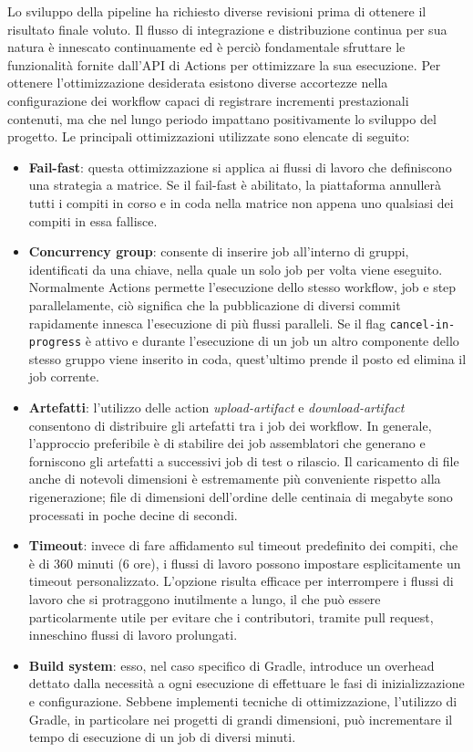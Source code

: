 Lo sviluppo della pipeline ha richiesto diverse revisioni prima di ottenere il risultato finale voluto. Il flusso di integrazione e distribuzione continua per sua natura è innescato continuamente ed è perciò fondamentale sfruttare le funzionalità fornite dall'API di Actions per ottimizzare la sua esecuzione. Per ottenere l'ottimizzazione desiderata esistono diverse accortezze nella configurazione dei workflow capaci di registrare incrementi prestazionali contenuti, ma che nel lungo periodo impattano positivamente lo sviluppo del progetto. Le principali ottimizzazioni utilizzate sono elencate di seguito:
\begin{itemize}
	\item \textbf{Fail-fast}: questa ottimizzazione si applica ai flussi di lavoro che definiscono una strategia a matrice. Se il fail-fast è abilitato, la piattaforma annullerà tutti i compiti in corso e in coda nella matrice non appena uno qualsiasi dei compiti in essa fallisce.
	\item \textbf{Concurrency group}: consente di inserire job all'interno di gruppi, identificati da una chiave, nella quale un solo job per volta viene eseguito. Normalmente Actions permette l'esecuzione dello stesso workflow, job e step parallelamente, ciò significa che la pubblicazione di diversi commit rapidamente innesca l'esecuzione di più flussi paralleli. Se il flag \texttt{cancel-in-progress} è attivo e durante l'esecuzione di un job un altro componente dello stesso gruppo viene inserito in coda, quest'ultimo prende il posto ed elimina il job corrente.
	\item \textbf{Artefatti}: l'utilizzo delle action \textit{upload-artifact} e \textit{download-artifact} consentono di distribuire gli artefatti tra i job dei workflow. In generale, l'approccio preferibile è di stabilire dei job assemblatori che generano e forniscono gli artefatti a successivi job di test o rilascio. Il caricamento di file anche di notevoli dimensioni è estremamente più conveniente rispetto alla rigenerazione; file di dimensioni dell'ordine delle centinaia di megabyte sono processati in poche decine di secondi.
	\item \textbf{Timeout}: invece di fare affidamento sul timeout predefinito dei compiti, che è di 360 minuti (6 ore), i flussi di lavoro possono impostare esplicitamente un timeout personalizzato. L'opzione risulta efficace per interrompere i flussi di lavoro che si protraggono inutilmente a lungo, il che può essere particolarmente utile per evitare che i contributori, tramite pull request, inneschino flussi di lavoro prolungati.
	\item \textbf{Build system}: esso, nel caso specifico di Gradle, introduce un overhead dettato dalla necessità a ogni esecuzione di effettuare le fasi di inizializzazione e configurazione. Sebbene implementi tecniche di ottimizzazione, l'utilizzo di Gradle, in particolare nei progetti di grandi dimensioni, può incrementare il tempo di esecuzione di un job di diversi minuti.
\end{itemize}

